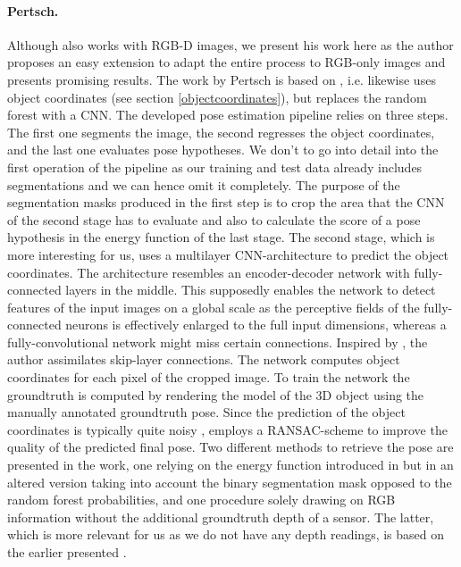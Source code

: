 \paragraph{Pertsch.}

Although \cite{pertsch} also works with RGB-D images, we present his work here as the author proposes an easy extension to adapt the entire process to RGB-only images and presents promising results. The work by Pertsch is based on \cite{brachmann1}, i.e. likewise uses object coordinates  (see section \ref{objectcoordinates}), but replaces the random forest with a CNN. The developed pose estimation pipeline relies on three steps. The first one segments the image, the second regresses the object coordinates, and the last one evaluates pose hypotheses. 
\nnewline
We don't to go into detail into the first operation of the pipeline as our training and test data already includes segmentations and we can hence omit it completely. The purpose of the segmentation masks produced in the first step is to crop the area that the CNN of the second stage has to evaluate and also to calculate the score of a pose hypothesis in the energy function of the last stage. 
\nnewline
The second stage, which is more interesting for us, uses a multilayer CNN-architecture to predict the object coordinates. The architecture resembles an encoder-decoder network with fully-connected layers in the middle. This supposedly enables the network to detect features of the input images on a global scale as the perceptive fields of the fully-connected neurons is effectively enlarged to the full input dimensions, whereas a fully-convolutional network might miss certain connections. 
\nnewline
Inspired by \cite{oronneberger}, the author assimilates skip-layer connections. The network computes object coordinates for each pixel of the cropped image. To train the network the groundtruth is computed by rendering the model of the 3D object using the manually annotated groundtruth pose. Since the prediction of the object coordinates is typically quite noisy \cite{bb8}, \cite{pertsch} employs a RANSAC-scheme to improve the quality of the predicted final pose. Two different methods to retrieve the pose are presented in the work, one relying on the energy function introduced in \cite{brachmann1} but in an altered version taking into account the binary segmentation mask opposed to the random forest probabilities, and one procedure solely drawing on RGB information without the additional groundtruth depth of a sensor. The latter, which is more relevant for us as we do not have any depth readings, is based on the earlier presented \cite{brachmann2}. 
